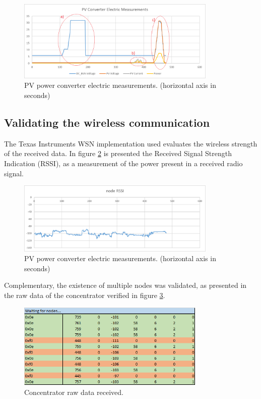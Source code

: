 \begin{figure}[h!]
	\centering
	\includegraphics[width=0.85\textwidth,keepaspectratio]{figures/measurements}
	\caption{PV power converter electric measurements. (horizontal axis in seconds)}
	\label{fig:3.4.measurements}
\end{figure}

\subsection{Validating the wireless communication}
The Texas Instruments WSN implementation used evaluates the wireless strength of the received data. In figure \ref{fig:3.4.rssi} is presented the Received Signal Strength Indication (RSSI), as a measurement of the power present in a received radio signal. 


\begin{figure}[h!]
	\centering
	\includegraphics[width=0.85\textwidth,keepaspectratio]{figures/RSSI}
	\caption{PV power converter electric measurements. (horizontal axis in seconds)}
	\label{fig:3.4.rssi}
\end{figure}

Complementary, the existence of multiple nodes was validated, as presented in the raw data of the concentrator verified in figure \ref{fig:3.4.twonodes}.


\begin{figure}[h!]
	\centering
	\includegraphics[width=0.80\textwidth,keepaspectratio]{figures/twonodes}
	\caption{Concentrator raw data received.}
	\label{fig:3.4.twonodes}
\end{figure} 



